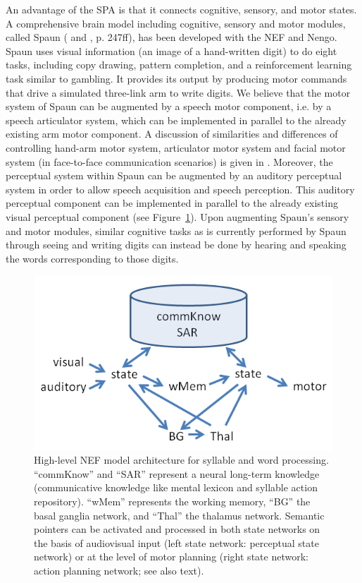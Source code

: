 \documentclass[conference]{IEEEtran}
\begin{document}
An advantage of the SPA is that it connects cognitive,
sensory, and motor states. A comprehensive brain model including
cognitive, sensory and motor modules, called Spaun
(\cite{eliasmith2012} and \cite{eliasmith2013}, p. 247ff), has been
developed with the NEF and Nengo.
Spaun uses visual information (an image of a hand-written digit)
to do eight tasks, including copy drawing,
pattern completion, and a reinforcement learning task
similar to gambling.
It provides its output by producing motor commands that
drive a simulated three-link arm to write digits.
We believe that the motor system of Spaun
can be augmented by a speech motor component, i.e. by a speech
articulator system, which can be implemented in parallel to the
already existing arm motor component. A discussion of similarities
and differences of controlling hand-arm motor system, articulator
motor system and facial motor system (in face-to-face communication
scenarios) is given in \cite{kroger2010}. Moreover, the perceptual
system within Spaun can be augmented by an auditory perceptual system
in order to allow speech acquisition and speech perception. This
auditory perceptual component can be implemented in parallel to the
already existing visual perceptual component (see
Figure~\ref{fig:model}).
Upon augmenting Spaun's sensory and motor modules,
similar cognitive tasks as is currently performed by Spaun
through seeing and writing digits
can instead be done by hearing and speaking
the words corresponding to those digits.

\begin{figure}[!t]
\centering
\includegraphics[width=\columnwidth]{model}
\caption{High-level NEF model architecture for syllable and word processing.
  ``commKnow'' and ``SAR'' represent a neural long-term knowledge
  (communicative knowledge like mental lexicon and syllable action
  repository). ``wMem'' represents the working memory, ``BG'' the
  basal ganglia network, and ``Thal'' the thalamus
  network. Semantic pointers can be activated and processed in both
  state networks on the basis of audiovisual input (left state
  network: perceptual state network) or at the level of motor planning
  (right state network: action planning network; see also text).}
\label{fig:model}
\end{figure}
\end{document}
